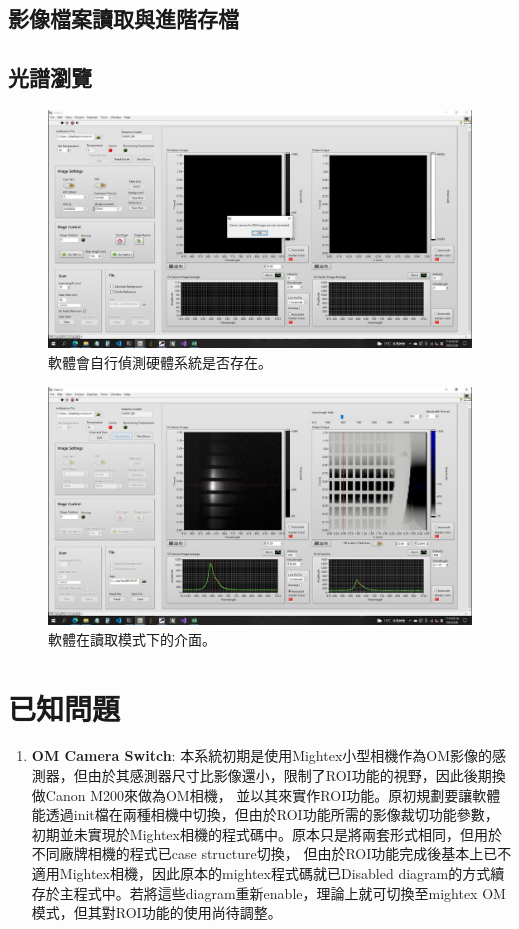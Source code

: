 \documentclass[12pt]{article}
\begin{document}
    \subsection{影像檔案讀取與進階存檔}
    \subsection{光譜瀏覽}
    \begin{figure}
        \centering
        \includegraphics[width=\linewidth]{detectHW.jpeg}
        \caption{軟體會自行偵測硬體系統是否存在。}
        \label{figure: detect hardware}
    \end{figure}
    \begin{figure}
        \centering
        \includegraphics[width=\linewidth]{readmode.jpeg}
        \caption{軟體在讀取模式下的介面。}
        \label{figure: om_evenest_on}
    \end{figure}
    \section{已知問題}
    \begin{enumerate}
        \item \textbf{OM Camera Switch}: 本系統初期是使用Mightex小型相機作為OM影像的感測器，但由於其感測器尺寸比影像還小，限制了ROI功能的視野，因此後期換做Canon M200來做為OM相機，
        並以其來實作ROI功能。原初規劃要讓軟體能透過init檔在兩種相機中切換，但由於ROI功能所需的影像裁切功能參數，初期並未實現於Mightex相機的程式碼中。原本只是將兩套形式相同，但用於不同廠牌相機的程式已case structure切換，
        但由於ROI功能完成後基本上已不適用Mightex相機，因此原本的mightex程式碼就已Disabled diagram的方式續存於主程式中。若將這些diagram重新enable，理論上就可切換至mightex OM模式，但其對ROI功能的使用尚待調整。
    \end{enumerate}
\end{document}

